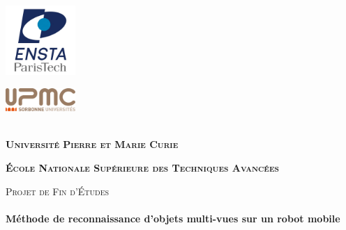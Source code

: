 \begin{titlepage}

	\begin{center}
	
		\begin{minipage}{0.45\textwidth}
		\begin{flushleft}
			\includegraphics[width=100px]{enstalogo.png}
		\end{flushleft}
		\end{minipage}
		\begin{minipage}{0.45\textwidth}
		\begin{flushright}
			\includegraphics[width=100px]{upmclogo.png}
		\end{flushright}
		\end{minipage}
		\mbox{}\\[1.5cm] 

		\textbf{ \textsc{\Large Université Pierre et Marie Curie}\\[0.5cm] }
		
		\textbf{ \textsc{\Large École Nationale Supérieure des Techniques Avancées}\\[0.5cm]}
		
		\vfill
	
		\textsc{\large Projet de Fin d'Études}\\[0.5cm]
	
		\HRule \\[0.4cm]
		{ \huge \bfseries Méthode de reconnaissance d'objets multi-vues sur un robot mobile}\\[0.15cm]
	
		      \HRule \\[1.5cm]
	                

\end{center}
\end{titlepage}
